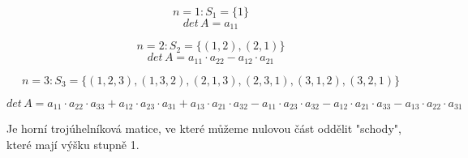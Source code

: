 \begin{example}
    $$n = 1: S_1=\{1\}$$
    $$det\,A = a_{11}$$
\end{example}

\begin{example}
    $$n = 2: S_2=\{(1,2), (2,1)\}$$
    $$det\,A = a_{11} \cdot a_{22} - a_{12} \cdot a_{21}$$
\end{example}

\begin{example}
    $$n = 3: S_3=\{(1,2,3), (1,3,2), (2,1,3), (2,3,1), (3,1,2), (3,2,1)\}$$

    $$det\,A = a_{11}\cdot a_{22}\cdot a_{33} +
               a_{12}\cdot a_{23}\cdot a_{31} +
               a_{13}\cdot a_{21}\cdot a_{32} -
               a_{11}\cdot a_{23}\cdot a_{32} -
               a_{12}\cdot a_{21}\cdot a_{33} -
               a_{13}\cdot a_{22}\cdot a_{31}
    $$
\end{example}

\begin{definition}
    Je horní trojúhelníková matice, ve které můžeme nulovou část oddělit "schody", které
    mají výšku stupně 1.
\end{definition}


